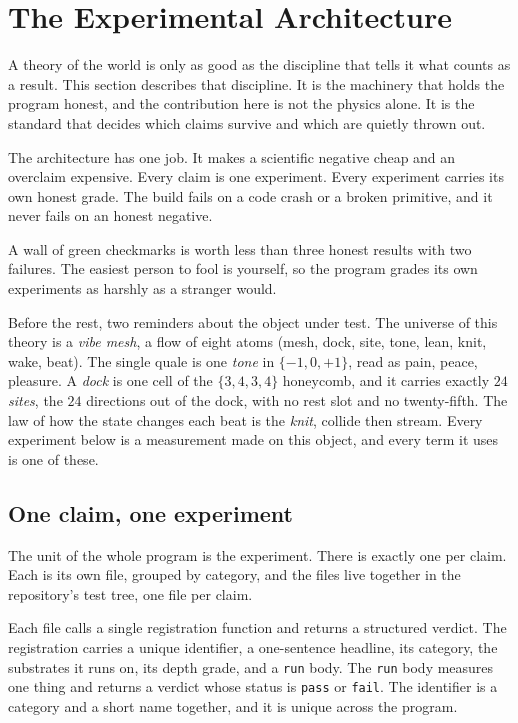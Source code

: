 \section{The Experimental Architecture}

A theory of the world is only as good as the discipline that tells it what counts as a result. This section describes that discipline. It is the machinery that holds the program honest, and the contribution here is not the physics alone. It is the standard that decides which claims survive and which are quietly thrown out.

The architecture has one job. It makes a scientific negative cheap and an overclaim expensive. Every claim is one experiment. Every experiment carries its own honest grade. The build fails on a code crash or a broken primitive, and it never fails on an honest negative.

\begin{principle}
A wall of green checkmarks is worth less than three honest results with two failures. The easiest person to fool is yourself, so the program grades its own experiments as harshly as a stranger would.
\end{principle}

Before the rest, two reminders about the object under test. The universe of this theory is a \emph{vibe mesh}, a flow of eight atoms (mesh, dock, site, tone, lean, knit, wake, beat). The single quale is one \emph{tone} in $\{-1, 0, +1\}$, read as pain, peace, pleasure. A \emph{dock} is one cell of the $\{3,4,3,4\}$ honeycomb, and it carries exactly $24$ \emph{sites}, the $24$ directions out of the dock, with no rest slot and no twenty-fifth. The law of how the state changes each beat is the \emph{knit}, collide then stream. Every experiment below is a measurement made on this object, and every term it uses is one of these.

\subsection{One claim, one experiment}

The unit of the whole program is the experiment. There is exactly one per claim. Each is its own file, grouped by category, and the files live together in the repository's test tree, one file per claim.

Each file calls a single registration function and returns a structured verdict. The registration carries a unique identifier, a one-sentence headline, its category, the substrates it runs on, its depth grade, and a \texttt{run} body. The \texttt{run} body measures one thing and returns a verdict whose status is \texttt{pass} or \texttt{fail}. The identifier is a category and a short name together, and it is unique across the program.

